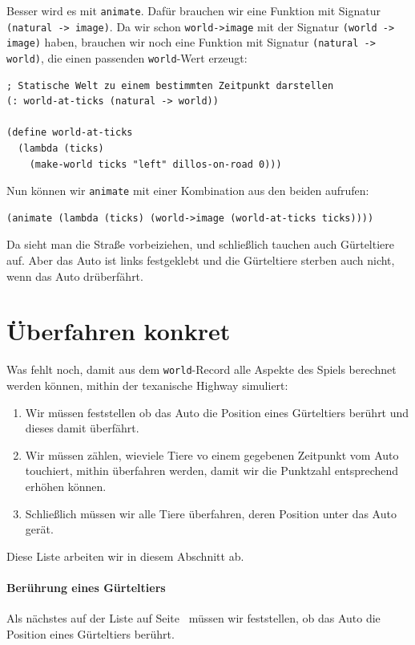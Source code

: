 Besser wird es mit \lstinline{animate}.  Dafür brauchen wir eine
Funktion mit Signatur \lstinline{(natural -> image)}.  Da wir schon
\lstinline{world->image} mit der Signatur \lstinline{(world -> image)}
haben, brauchen wir noch eine Funktion mit Signatur
\lstinline{(natural -> world)}, die einen passenden
\lstinline{world}-Wert erzeugt:
%
\begin{lstlisting}
; Statische Welt zu einem bestimmten Zeitpunkt darstellen
(: world-at-ticks (natural -> world))

(define world-at-ticks
  (lambda (ticks)
    (make-world ticks "left" dillos-on-road 0)))
\end{lstlisting}
%
Nun können wir \lstinline{animate} mit einer Kombination aus den
beiden aufrufen:
%
\begin{lstlisting}
(animate (lambda (ticks) (world->image (world-at-ticks ticks))))
\end{lstlisting}
%
Da sieht man die Straße vorbeiziehen, und schließlich tauchen auch
Gürteltiere auf.  Aber das Auto ist links festgeklebt und die
Gürteltiere sterben auch nicht, wenn das Auto drüberfährt.

\section{Überfahren konkret}
  
Was fehlt noch, damit aus dem
\lstinline{world}-Record alle Aspekte des Spiels berechnet werden
können, mithin der texanische Highway simuliert:\label{page:dillo-world-todos}
%
\begin{enumerate}
\item Wir müssen feststellen ob das Auto die Position eines
  Gürteltiers berührt und dieses damit überfährt.
\item Wir müssen zählen, wieviele Tiere vo einem gegebenen
  Zeitpunkt vom Auto touchiert, mithin überfahren werden, damit wir
  die Punktzahl entsprechend erhöhen können.
\item Schließlich müssen wir alle Tiere überfahren, deren Position
  unter das Auto gerät.
\end{enumerate}
%
Diese Liste arbeiten wir in diesem Abschnitt ab.
%
\paragraph{Berührung eines Gürteltiers} Als nächstes auf der Liste auf
Seite~\pageref{page:dillo-world-todos} müssen wir feststellen, ob das
Auto die Position eines Gürteltiers berührt.

